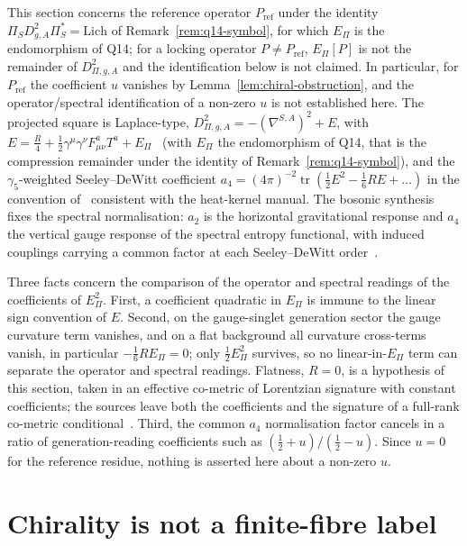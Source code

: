\documentclass[11pt]{article}
\theoremstyle{definition}
\newcommand{\tr}{\operatorname{tr}}
\newcommand{\EPi}{E_\Pi}
\newcommand{\PiS}{\Pi_S}
\begin{document}
    This section concerns the reference operator $P_{\mathrm{ref}}$ under the identity $\PiS
      D_{g,A}^2\PiS^{*}=\mathrm{Lich}$
    of Remark~\ref{rem:q14-symbol}, for which $\EPi$ is the endomorphism of Q14; for a locking operator
    $P\neq P_{\mathrm{ref}}$, $\EPi[P]$ is not the remainder of $D^2_{\Pi,g,A}$ and the identification below is not
    claimed.
    In particular, for $P_{\mathrm{ref}}$ the coefficient $u$ vanishes by Lemma~\ref{lem:chiral-obstruction}, and the
    operator/spectral identification of a non-zero $u$ is not established here.
    The projected square is Laplace-type, $D^2_{\Pi,g,A}=-(\nabla^{S,A})^2+E$, with
    $E=\tfrac{R}{4}+\tfrac12\gamma^\mu\gamma^\nu F^a_{\mu\nu}T^a+\EPi$~\cite{Beau2026q14} (with $\EPi$ the endomorphism
    of Q14, that is the compression remainder under the identity of Remark~\ref{rem:q14-symbol}), and the
    $\gamma_5$-weighted Seeley--DeWitt coefficient $a_4=(4\pi)^{-2}\tr(\tfrac12E^2-\tfrac16 RE+\dots)$ in
    the convention of~\cite{Beau2026q14} consistent with the heat-kernel manual.
    The bosonic synthesis fixes the spectral normalisation: $a_2$ is the horizontal gravitational
    response and $a_4$ the vertical gauge response of the spectral entropy functional, with induced
    couplings carrying a common factor at each Seeley--DeWitt order~\cite{Beau2026q13, Beau2026q12}.

    Three facts concern the comparison of the operator and spectral readings of the coefficients of $\EPi^2$.
    First, a coefficient quadratic in $\EPi$ is immune to the linear sign convention of $E$.
    Second, on the gauge-singlet generation sector the gauge curvature term vanishes, and on a flat background all
    curvature cross-terms vanish, in particular $-\tfrac16 R\EPi=0$; only $\tfrac12\EPi^2$ survives, so no
    linear-in-$\EPi$ term can separate the operator and spectral readings.
    Flatness, $R=0$, is a hypothesis of this section, taken in an effective co-metric of Lorentzian signature with
    constant coefficients; the sources leave both the coefficients and the signature of a full-rank co-metric
    conditional~\cite{Beau2026q11}.
    Third, the common $a_4$ normalisation factor cancels in a ratio of generation-reading coefficients such as
    $(\tfrac12+u)/(\tfrac12-u)$.
    Since $u=0$ for the reference residue, nothing is asserted here about a non-zero $u$.

  \section{Chirality is not a finite-fibre label}
    \label{sec:nogo}
\end{document}
